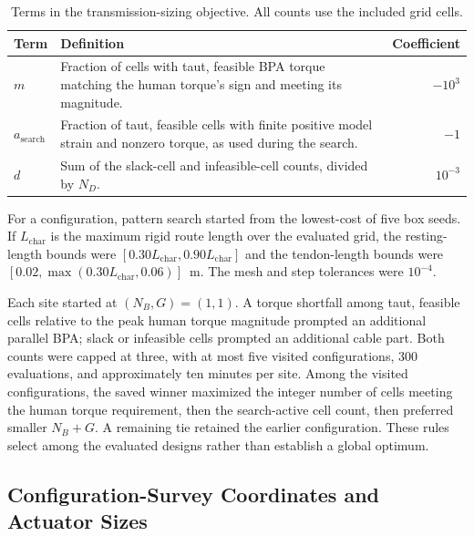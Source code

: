 \documentclass[utf8]{frontiers_suppmat} %
\begin{document}
\begin{table}[htbp]
\centering
\begingroup\fontsize{10pt}{12pt}\selectfont
\caption{Terms in the transmission-sizing objective. All counts use the included grid cells.}
\label{tab:survey_selection_terms}
\begin{tabularx}{\textwidth}{@{}lXr@{}}
\toprule
\textbf{Term} & \textbf{Definition} & \textbf{Coefficient} \\
\midrule
$m$ & Fraction of cells with taut, feasible BPA torque matching the human torque's sign and meeting its magnitude. & $-10^3$ \\
$a_{\mathrm{search}}$ & Fraction of taut, feasible cells with finite positive model strain and nonzero torque, as used during the search. & $-1$ \\
$d$ & Sum of the slack-cell and infeasible-cell counts, divided by $N_D$. & $10^{-3}$ \\
\bottomrule
\end{tabularx}
\endgroup
\end{table}

For a configuration, pattern search started from the lowest-cost of five box seeds. If $L_{\mathrm{char}}$ is the maximum rigid route length over the evaluated grid, the resting-length bounds were $[0.30L_{\mathrm{char}},0.90L_{\mathrm{char}}]$ and the tendon-length bounds were $[0.02,\max(0.30L_{\mathrm{char}},0.06)]$~m. The mesh and step tolerances were $10^{-4}$.

Each site started at $(N_B,G)=(1,1)$. A torque shortfall among taut, feasible cells relative to the peak human torque magnitude prompted an additional parallel BPA; slack or infeasible cells prompted an additional cable part. Both counts were capped at three, with at most five visited configurations, 300 evaluations, and approximately ten minutes per site. Among the visited configurations, the saved winner maximized the integer number of cells meeting the human torque requirement, then the search-active cell count, then preferred smaller $N_B+G$. A remaining tie retained the earlier configuration. These rules select among the evaluated designs rather than establish a global optimum.

\clearpage
\subsection{Configuration-Survey Coordinates and Actuator Sizes}
\end{document}
